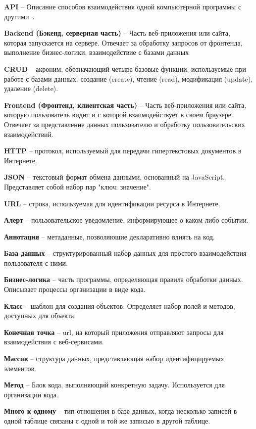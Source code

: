 \documentclass[a4paper,article]{article}
\begin{document}
    \textbf{API} -- Описание способов взаимодействия одной компьютерной программы с другими~\cite{apiwikipedia}.

    \textbf{Backend (Бэкенд, серверная часть)} -- Часть веб-приложения или сайта, которая запускается на сервере. Отвечает за обработку запросов от фронтенда, выполнение бизнес-логики, взаимодействие с базами данных

    \textbf{CRUD} -- акроним, обозначающий четыре базовые функции, используемые при работе с базами данных: создание (create), чтение (read), модификация (update), удаление (delete).

    \textbf{Frontend (Фронтенд, клиентская часть)} -- Часть веб-приложения или сайта, которую пользователь видит и с которой взаимодействует в своем браузере. Отвечает за представление данных пользователю и обработку пользовательских взаимодействий.

    \textbf{HTTP} -- протокол, используемый для передачи гипертекстовых документов в Интернете.

    \textbf{JSON} -- текстовый формат обмена данными, основанный на JavaScript. Представляет собой набор пар "ключ: значение".

    \textbf{URL} -- строка, используемая для идентификации ресурса в Интернете.

    \textbf{Алерт} -- пользовательское уведомление, информирующее о каком-либо событии.

    \textbf{Аннотация} -- метаданные, позволяющие декларативно влиять на код.

    \textbf{База данных} -- структурированный набор данных для простого взаимодействия пользователя с ними.

    \textbf{Бизнес-логика} -- часть программы, определяющая правила обработки данных. Описывает процессы организации в виде кода.

    \textbf{Класс} -- шаблон для создания объектов. Определяет набор полей и методов, доступных для объекта.

    \textbf{Конечная точка} -- url, на который приложения отправляют запросы для взаимодействия с веб-сервисами.

    \textbf{Массив} -- структура данных, представляющая набор идентифицируемых элементов.

    \textbf{Метод} -- Блок кода, выполняющий конкретную задачу. Используется для организации кода.

    \textbf{Много к одному} -- тип отношения в базе данных, когда несколько записей в одной таблице связаны с одной и той же записью в другой таблице.
\end{document}
